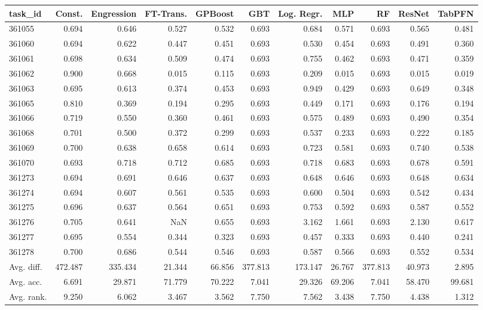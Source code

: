 \begin{tabular}{lrrrrrrrrrr}
\toprule
task\_id & Const. & Engression & FT-Trans. & GPBoost & GBT & Log. Regr. & MLP & RF & ResNet & TabPFN \\
\midrule
361055 & 0.694 & 0.646 & 0.527 & 0.532 & 0.693 & 0.684 & 0.571 & 0.693 & 0.565 & 0.481 \\
361060 & 0.694 & 0.622 & 0.447 & 0.451 & 0.693 & 0.530 & 0.454 & 0.693 & 0.491 & 0.360 \\
361061 & 0.698 & 0.634 & 0.509 & 0.474 & 0.693 & 0.755 & 0.462 & 0.693 & 0.471 & 0.359 \\
361062 & 0.900 & 0.668 & 0.015 & 0.115 & 0.693 & 0.209 & 0.015 & 0.693 & 0.015 & 0.019 \\
361063 & 0.695 & 0.613 & 0.374 & 0.453 & 0.693 & 0.949 & 0.429 & 0.693 & 0.649 & 0.348 \\
361065 & 0.810 & 0.369 & 0.194 & 0.295 & 0.693 & 0.449 & 0.171 & 0.693 & 0.176 & 0.194 \\
361066 & 0.719 & 0.550 & 0.360 & 0.461 & 0.693 & 0.575 & 0.489 & 0.693 & 0.490 & 0.354 \\
361068 & 0.701 & 0.500 & 0.372 & 0.299 & 0.693 & 0.537 & 0.233 & 0.693 & 0.222 & 0.185 \\
361069 & 0.700 & 0.638 & 0.658 & 0.614 & 0.693 & 0.723 & 0.581 & 0.693 & 0.740 & 0.538 \\
361070 & 0.693 & 0.718 & 0.712 & 0.685 & 0.693 & 0.718 & 0.683 & 0.693 & 0.678 & 0.591 \\
361273 & 0.694 & 0.691 & 0.646 & 0.637 & 0.693 & 0.648 & 0.646 & 0.693 & 0.648 & 0.634 \\
361274 & 0.694 & 0.607 & 0.561 & 0.535 & 0.693 & 0.600 & 0.504 & 0.693 & 0.542 & 0.434 \\
361275 & 0.696 & 0.637 & 0.564 & 0.651 & 0.693 & 0.753 & 0.592 & 0.693 & 0.587 & 0.552 \\
361276 & 0.705 & 0.641 & NaN & 0.655 & 0.693 & 3.162 & 1.661 & 0.693 & 2.130 & 0.617 \\
361277 & 0.695 & 0.554 & 0.344 & 0.323 & 0.693 & 0.457 & 0.333 & 0.693 & 0.440 & 0.241 \\
361278 & 0.700 & 0.686 & 0.544 & 0.546 & 0.693 & 0.587 & 0.566 & 0.693 & 0.552 & 0.534 \\
Avg. diff. & 472.487 & 335.434 & 21.344 & 66.856 & 377.813 & 173.147 & 26.767 & 377.813 & 40.973 & 2.895 \\
Avg. acc. & 6.691 & 29.871 & 71.779 & 70.222 & 7.041 & 29.326 & 69.206 & 7.041 & 58.470 & 99.681 \\
Avg. rank. & 9.250 & 6.062 & 3.467 & 3.562 & 7.750 & 7.562 & 3.438 & 7.750 & 4.438 & 1.312 \\
\bottomrule
\end{tabular}

